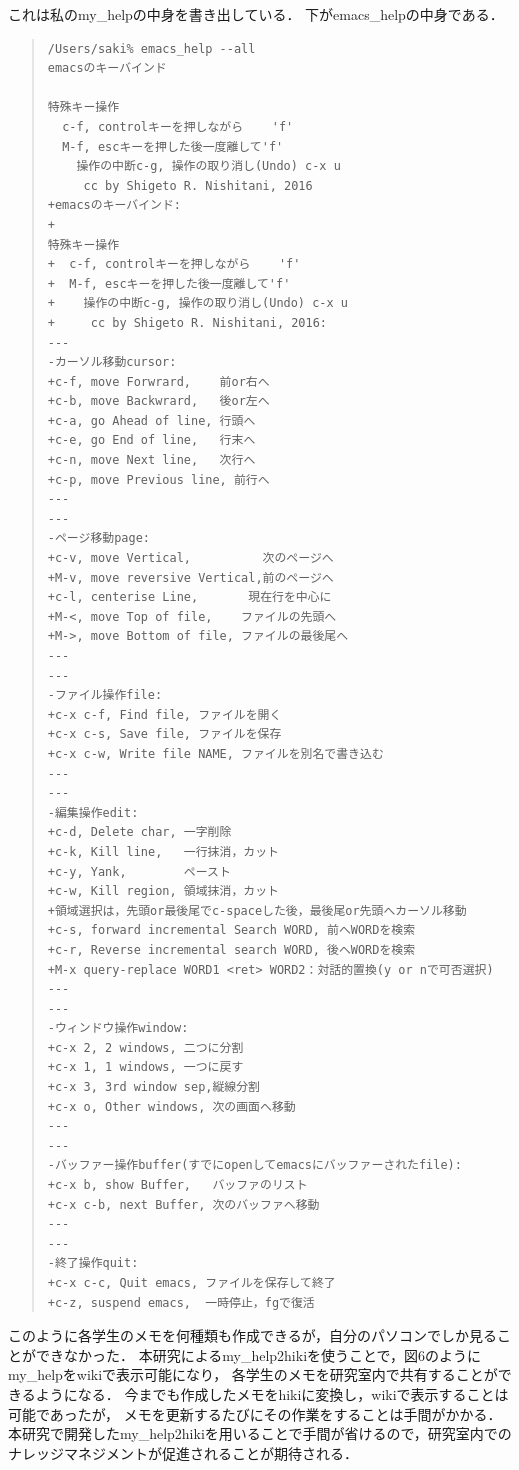 これは私のmy\_helpの中身を書き出している．
下がemacs\_helpの中身である．

\begin{quote}\begin{verbatim}
/Users/saki% emacs_help --all
emacsのキーバインド

特殊キー操作
  c-f, controlキーを押しながら    'f'
  M-f, escキーを押した後一度離して'f'
    操作の中断c-g, 操作の取り消し(Undo) c-x u
     cc by Shigeto R. Nishitani, 2016
+emacsのキーバインド:
+
特殊キー操作
+  c-f, controlキーを押しながら    'f'
+  M-f, escキーを押した後一度離して'f'
+    操作の中断c-g, 操作の取り消し(Undo) c-x u
+     cc by Shigeto R. Nishitani, 2016:
---
-カーソル移動cursor:
+c-f, move Forwrard,    前or右へ
+c-b, move Backwrard,   後or左へ
+c-a, go Ahead of line, 行頭へ
+c-e, go End of line,   行末へ
+c-n, move Next line,   次行へ
+c-p, move Previous line, 前行へ
---
---
-ページ移動page:
+c-v, move Vertical,          次のページへ
+M-v, move reversive Vertical,前のページへ
+c-l, centerise Line,       現在行を中心に
+M-<, move Top of file,    ファイルの先頭へ
+M->, move Bottom of file, ファイルの最後尾へ
---
---
-ファイル操作file:
+c-x c-f, Find file, ファイルを開く
+c-x c-s, Save file, ファイルを保存
+c-x c-w, Write file NAME, ファイルを別名で書き込む
---
---
-編集操作edit:
+c-d, Delete char, 一字削除
+c-k, Kill line,   一行抹消，カット
+c-y, Yank,        ペースト
+c-w, Kill region, 領域抹消，カット
+領域選択は，先頭or最後尾でc-spaceした後，最後尾or先頭へカーソル移動
+c-s, forward incremental Search WORD, 前へWORDを検索
+c-r, Reverse incremental search WORD, 後へWORDを検索
+M-x query-replace WORD1 <ret> WORD2：対話的置換(y or nで可否選択)
---
---
-ウィンドウ操作window:
+c-x 2, 2 windows, 二つに分割
+c-x 1, 1 windows, 一つに戻す
+c-x 3, 3rd window sep,縦線分割
+c-x o, Other windows, 次の画面へ移動
---
---
-バッファー操作buffer(すでにopenしてemacsにバッファーされたfile):
+c-x b, show Buffer,   バッファのリスト
+c-x c-b, next Buffer, 次のバッファへ移動
---
---
-終了操作quit:
+c-x c-c, Quit emacs, ファイルを保存して終了
+c-z, suspend emacs,  一時停止，fgで復活
\end{verbatim}\end{quote}

このように各学生のメモを何種類も作成できるが，自分のパソコンでしか見ることができなかった．
本研究によるmy\_help2hikiを使うことで，図6のようにmy\_helpをwikiで表示可能になり，
各学生のメモを研究室内で共有することができるようになる．
今までも作成したメモをhikiに変換し，wikiで表示することは可能であったが，
メモを更新するたびにその作業をすることは手間がかかる．
本研究で開発したmy\_help2hikiを用いることで手間が省けるので，研究室内での
ナレッジマネジメントが促進されることが期待される．